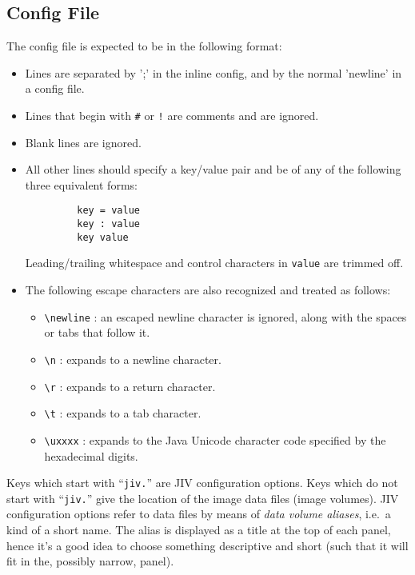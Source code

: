 \subsection{Config File}
\label{sec:config-file}

The config file is expected to be in the following format:
\begin{itemize}
\item Lines are separated by ';' in the inline config, and by the
  normal 'newline' in a config file.
\item Lines that begin with \verb|#| or \verb|!| are comments and are
  ignored. 
\item Blank lines are ignored.
\item All other lines should specify a key/value pair and be of any of
  the following three equivalent forms:
\begin{verbatim}
         key = value
         key : value
         key value
\end{verbatim}
  Leading/trailing whitespace and control characters in \verb|value|
  are trimmed off.
\item The following escape characters are also recognized and
  treated as follows: 
  \begin{itemize}
  \item \verb|\newline| : 
    an escaped newline character is ignored, along with the spaces or
    tabs that follow it. 
  \item \verb|\n| : expands to a newline character.
  \item \verb|\r| : expands to a return character.
  \item \verb|\t| : expands to a tab character.
  \item \verb|\uxxxx| : expands to the Java Unicode character code
    specified by the hexadecimal digits.  
  \end{itemize}
\end{itemize} 

Keys which start with ``\verb+jiv.+'' are JIV configuration options.
Keys which do not start with ``\verb+jiv.+'' give the location of the
image data files (image volumes). JIV configuration options refer to
data files by means of {\em data volume aliases}, i.e.\ a kind of a
short name.  The alias is displayed as a title at the top of each
panel, hence it's a good idea to choose something descriptive and
short (such that it will fit in the, possibly narrow, panel).

